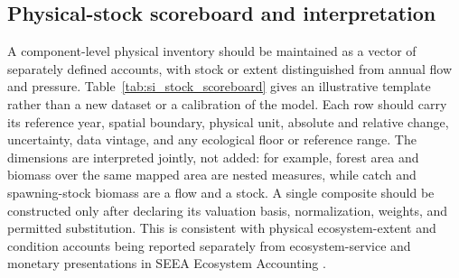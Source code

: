\subsection{Physical-stock scoreboard and interpretation}\label{si:stocks}

A component-level physical inventory should be maintained as a vector of separately defined accounts, with stock or extent distinguished from annual flow and pressure. Table~\ref{tab:si_stock_scoreboard} gives an illustrative template rather than a new dataset or a calibration of the model. Each row should carry its reference year, spatial boundary, physical unit, absolute and relative change, uncertainty, data vintage, and any ecological floor or reference range. The dimensions are interpreted jointly, not added: for example, forest area and biomass over the same mapped area are nested measures, while catch and spawning-stock biomass are a flow and a stock. A single composite should be constructed only after declaring its valuation basis, normalization, weights, and permitted substitution. This is consistent with physical ecosystem-extent and condition accounts being reported separately from ecosystem-service and monetary presentations in SEEA Ecosystem Accounting \citep{UN2021SEEA_EA}.

